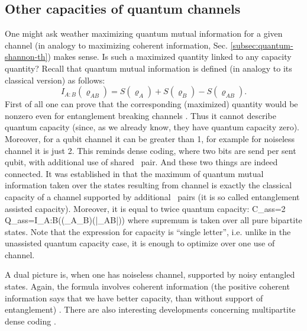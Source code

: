 \documentclass[rmp,12pt,preprint]{revtex4-2}
\begin{document}
\subsection{Other capacities of quantum channels}
\label{subsec:dense-cap}
One might ask weather maximizing quantum mutual information for a
given channel (in analogy to maximizing coherent information,
Sec. \ref{subsec:quantum-shannon-th}) makes sense. Is such a maximized
quantity linked to any capacity quantity?  Recall that quantum mutual
information is defined (in analogy to its classical version) as
follows:
\begin{equation}
I_{A:B}(\varrho_{AB})=S(\varrho_{A}) + S(\varrho_{B}) -
S(\varrho_{AB}). \label{MutualInfo}
\end{equation}
First of all one can prove that the corresponding (maximized) quantity would be nonzero even
for entanglement breaking channels
\cite{AdamiC1996-neumann-cap,BelavkinO1998-mutual}. Thus it cannot
describe quantum capacity (since, as we already know, they have
quantum capacity zero). Moreover, for a qubit channel it can be
greater than 1, for example for noiseless channel it is just 2. This
reminds dense coding, where two bits are send per sent qubit, with
additional use of shared \epr\ pair. And these two things are indeed
connected. It was established in
\cite{BennettSST1999-eacap,BennettSST-eacap2001} that
the maximum of quantum mutual information taken over the states
resulting from channel is exactly the classical capacity of a channel
supported by additional \epr\ pairs (it is so called entanglement
assisted capacity).  Moreover, it is equal to twice quantum capacity:
\be
C_{ass}=2 Q_{ass}=\sup I_{A:B}\bigl((\id_A\ot \Lambda_B)(|\psi\>_{AB}\<\psi|)\bigl)
\ee
where supremum is taken over all pure bipartite states.
Note that the expression for capacity  is ``single letter'', i.e. unlike in the unassisted quantum capacity case, it is enough to optimize over one use of channel.

A dual picture is, when one has noiseless
channel, supported by noisy entangled states. Again, the formula
involves coherent information (the positive coherent information
says that we have better capacity, than without support of
entanglement) \cite{Bowen-dense,HHH-IBM-dense}.
There are also interesting developments concerning multipartite dense coding
\cite{BrussALMSS2005-multidense,HorodeckiP2006-multidense}.
\end{document}
